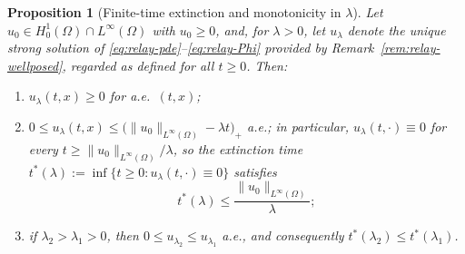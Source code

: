 \documentclass[11pt]{elsarticle}
\newtheorem{proposition}[theorem]{Proposition}
\theoremstyle{definition}
\theoremstyle{remark}
\numberwithin{equation}{section}
\begin{document}
\begin{proposition}[Finite-time extinction and monotonicity in $\lambda$]
	\label{prop:extinction}
	Let $u_0\in H_0^1(\Omega)\cap L^\infty(\Omega)$ with $u_0\ge0$, and,
	for $\lambda>0$, let $u_\lambda$ denote the unique strong solution of
	\eqref{eq:relay-pde}--\eqref{eq:relay-Phi} provided by
	Remark~\ref{rem:relay-wellposed}, regarded as defined for all
	$t\ge0$. Then:
	\begin{enumerate}
		\item[\rm(a)] $u_\lambda(t,x)\ge0$ for a.e.\ $(t,x)$;
		\item[\rm(b)] $0\le u_\lambda(t,x)\le
		\bigl(\|u_0\|_{L^\infty(\Omega)}-\lambda t\bigr)_+$ a.e.; in
		particular, $u_\lambda(t,\cdot)\equiv0$ for every
		$t\ge\|u_0\|_{L^\infty(\Omega)}/\lambda$, so the extinction time
		$t^*(\lambda):=\inf\{t\ge0:u_\lambda(t,\cdot)\equiv0\}$ satisfies
		\[
		t^*(\lambda)\le\frac{\|u_0\|_{L^\infty(\Omega)}}{\lambda};
		\]
		\item[\rm(c)] if $\lambda_2>\lambda_1>0$, then
		$0\le u_{\lambda_2}\le u_{\lambda_1}$ a.e., and consequently
		$t^*(\lambda_2)\le t^*(\lambda_1)$.
	\end{enumerate}
\end{proposition}
\end{document}
